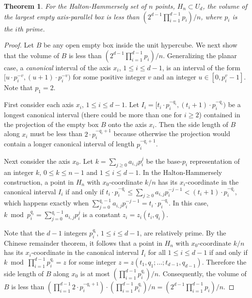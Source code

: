 \documentclass[11pt]{article}
\newtheorem{theorem}{Theorem}
\begin{document}
\begin{theorem} \label{T3}
For the  Halton-Hammersely set of $n$ points, $H_n \subset U_d$, 
the volume of the largest empty axis-parallel box is less than 
$(2^{d-1} \prod_{i=1}^{d-1} p_i) / n$, where $p_i$ is the $i$th prime.
\end{theorem}
\begin{proof}
Let $B$ be any open empty box inside the unit hypercube.
We next show that the volume of $B$
is less than $(2^{d-1} \prod_{i=1}^{d-1} p_i) / n$.
Generalizing the planar case,
a \emph{canonical} interval of the axis $x_i$, $1 \le i \le d - 1$,
is an interval of the form
$[u \cdot p_i^{-v}, (u+1) \cdot p_i^{-v})$
for some positive integer $v$ and an integer $u \in [0, p_i^v - 1]$.
Note that $p_1 = 2$.

First consider each axis $x_i$, $1 \le i \le d-1$.
Let $I_i = [t_i \cdot p_i^{-q_i}, (t_i + 1) \cdot p_i^{-q_i})$
be a longest canonical interval (there could be more than one for
$i \geq 2$)
contained in the projection of the empty box $B$ onto the axis $x_i$.
Then the side length of $B$ along $x_i$ must be less than
$2\cdot p_i^{-q_i+1}$ because otherwise the projection would
contain a longer canonical interval of length $p_i^{-q_i + 1}$.

Next consider the axis $x_0$.
Let $k=\sum_{j \ge 0} a_{i,j} p_i^j$ be the base-$p_i$ representation of
an integer $k$, $0 \le k \le n - 1$ and $1 \le i \le d-1$.
In the Halton-Hammersely construction,
a point in $H_n$ with $x_0$-coordinate $k/n$
has its $x_i$-coordinate in the canonical interval $I_i$ if and only if
$t_i \cdot p_i^{-q_i} \le \sum_{j\ge 0} a_{i,j} p_i^{-j-1}
	< (t_i + 1) \cdot p_i^{-q_i}$,
which happens exactly when
$\sum_{j=0}^{q_i-1} a_{i,j} p_i^{-j-1} = t_i \cdot p_i^{-q_i}$.
In this case, $k \bmod p_i^{q_i} = \sum_{j=0}^{q_i-1} a_{i,j} p_i^j$
is a constant $z_i = z_i(t_i, q_i)$.

Note that the $d-1$ integers $p_i^{q_i}$, $1 \le i \le d-1$,
are relatively prime.
By the Chinese remainder theorem,
it follows that a point in $H_n$ with $x_0$-coordinate $k/n$
has its $x_i$-coordinate in the canonical interval $I_i$ for all
$1 \le i \le d-1$
if and only if
$k \bmod \prod_{i=1}^{d-1} p_i^{q_i} = z$ for some integer
$z = z(t_1, q_1;\ldots;t_{d-1},q_{d-1})$.
Therefore the side length of $B$ along $x_0$
is at most $(\prod_{i=1}^{d-1} p_i^{q_i}) / n$.
Consequently, the volume of $B$ is less than
$(\prod_{i=1}^{d-1} 2 \cdot p_i^{-q_i+1}) \cdot
(\prod_{i=1}^{d-1} p_i^{q_i})/n =
(2^{d-1} \prod_{i=1}^{d-1} p_i) / n$.
\end{proof}
\end{document}
